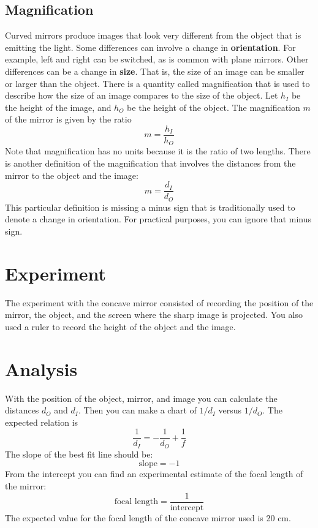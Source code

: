 \subsection{Magnification}
Curved mirrors produce images that look very different from the object that is emitting the light. Some differences can involve a change in \textbf{orientation}. For example, left and right can be switched, as is common with plane mirrors. Other differences can be a change in \textbf{size}. That is, the size of an image can be smaller or larger than the object. There is a quantity called magnification that is used to describe how the size of an image compares to the size of the object. Let $h_{I}$ be the height of the image, and $h_{O}$ be the height of the object. The magnification $m$ of the mirror is given by the ratio
\begin{equation}
    m = \frac{h_{I}}{h_{O}}
\end{equation}
Note that magnification has no units because it is the ratio of two lengths. There is another definition of the magnification that involves the distances from the mirror to the object and the image:
\begin{equation}
    m = \frac{d_{I}}{d_{O}}
\end{equation}
This particular definition is missing a minus sign that is traditionally used to denote a change in orientation. For practical purposes, you can ignore that minus sign.
\section{Experiment}
The experiment with the concave mirror consisted of recording the position of the mirror, the object, and the screen where the sharp image is projected. You also used a ruler to record the height of the object and the image.
\section{Analysis}
With the position of the object, mirror, and image you can calculate the distances $d_{O}$ and $d_{I}$. Then you can make a chart of $1 / d_{I}$ versus $1 / d_{O}$. The expected relation is
\begin{equation}
    \frac{1}{d_{I}} = -\frac{1}{d_{O}} + \frac{1}{f}
\end{equation}
The slope of the best fit line should be:
\begin{equation}
    \text{slope} = -1
\end{equation}
From the intercept you can find an experimental estimate of the focal length of the mirror:
\begin{equation}
    \text{focal length} = \frac{1}{\text{intercept}}
\end{equation}
The expected value for the focal length of the concave mirror used is 20 cm.

